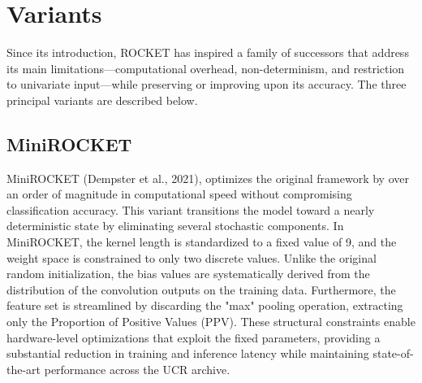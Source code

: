 \section{Variants}
Since its introduction, ROCKET has inspired a family of successors that address its main limitations—computational overhead, non-determinism, and restriction to univariate input—while preserving or improving upon its accuracy. The three principal variants are described below.

\subsection{MiniROCKET}
MiniROCKET (Dempster et al., 2021), optimizes the original framework by over an order of magnitude in computational speed without compromising classification accuracy. This variant transitions the model toward a nearly deterministic state by eliminating several stochastic components.
In MiniROCKET, the kernel length is standardized to a fixed value of 9, and the weight space is constrained to only two discrete values. Unlike the original random initialization, the bias values are systematically derived from the distribution of the convolution outputs on the training data. Furthermore, the feature set is streamlined by discarding the "max" pooling operation, extracting only the Proportion of Positive Values (PPV). These structural constraints enable hardware-level optimizations that exploit the fixed parameters, providing a substantial reduction in training and inference latency while maintaining state-of-the-art performance across the UCR archive.

